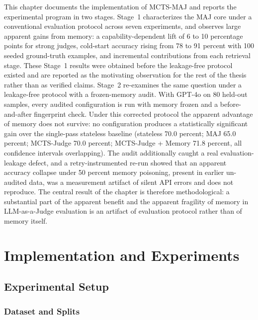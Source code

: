 \documentclass[12pt,a4paper]{report}
\begin{document}
This chapter documents the implementation of MCTS-MAJ and reports the experimental program in two stages. Stage~1 characterizes the MAJ core under a conventional evaluation protocol across seven experiments, and observes large apparent gains from memory: a capability-dependent lift of 6 to 10 percentage points for strong judges, cold-start accuracy rising from 78 to 91 percent with 100 seeded ground-truth examples, and incremental contributions from each retrieval stage. These Stage~1 results were obtained before the leakage-free protocol existed and are reported as the motivating observation for the rest of the thesis rather than as verified claims. Stage~2 re-examines the same question under a leakage-free protocol with a frozen-memory audit. With GPT-4o on 80 held-out samples, every audited configuration is run with memory frozen and a before-and-after fingerprint check. Under this corrected protocol the apparent advantage of memory does not survive: no configuration produces a statistically significant gain over the single-pass stateless baseline (stateless 70.0 percent; MAJ 65.0 percent; MCTS-Judge 70.0 percent; MCTS-Judge + Memory 71.8 percent, all confidence intervals overlapping). The audit additionally caught a real evaluation-leakage defect, and a retry-instrumented re-run showed that an apparent accuracy collapse under 50 percent memory poisoning, present in earlier un-audited data, was a measurement artifact of silent API errors and does not reproduce. The central result of the chapter is therefore methodological: a substantial part of the apparent benefit and the apparent fragility of memory in LLM-as-a-Judge evaluation is an artifact of evaluation protocol rather than of memory itself.

\tableofcontents

\chapter{Implementation and Experiments}

\section{Experimental Setup}

\subsection{Dataset and Splits}
\end{document}
